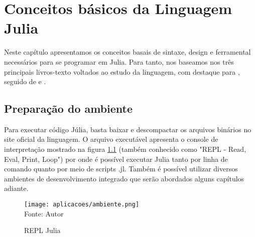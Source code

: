 %


\chapter{ Conceitos básicos da Linguagem Julia}

Neste capítulo apresentamos os conceitos basais de sintaxe, design e ferramental necessários para se programar em Julia. Para tanto, nos baseamos nos três principais livros-texto voltados ao estudo da linguagem, com destaque para \cite{Lobianco2019}, seguido de \cite{Lauwens2019} e \cite{Kwong2020}.

\section{Preparação do ambiente}
Para executar código Júlia, basta baixar e descompactar os arquivos binários no site oficial da linguagem. O arquivo executável apresenta o console de interpretação mostrado na figura \ref{REPL} (também conhecido como "REPL - Read, Eval, Print, Loop") por onde é possível executar Julia tanto por linha de comando quanto por meio de scripts .jl. Também é possível utilizar diversos ambientes de desenvolvimento integrado que serão abordados alguns capítulos adiante.
\begin{figure}[H]
\begin{center}
    \caption{REPL Julia} \label{REPL}
    \texttt{[image: aplicacoes/ambiente.png]} \\
    {\tiny \sf Fonte: Autor}
\end{center}
\end{figure} 

